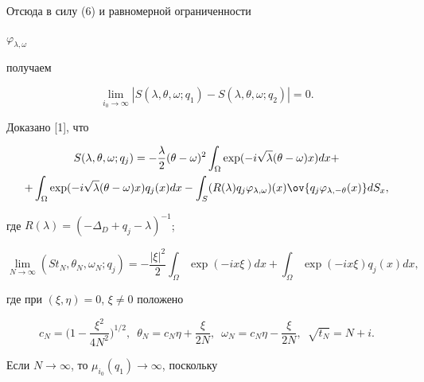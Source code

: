 Отсюда в силу (6) и равномерной ограниченности 


$\varphi_{\lambda,\omega}$ 


получаем 


\begin{equation} 


\lim_{i_0\to\infty} 


|S(\lambda,\theta,\omega;q_1)- 


S(\lambda,\theta,\omega;q_2)|=0. 


\end{equation} 


Доказано [1], что 


\begin{multline*} 


S(\lambda,\theta,\omega;q_j)=-\frac{\lambda}{2} 


(\theta-\omega)^2\int_\Omega\exp(-i\sqrt{\lambda} 


(\theta-\omega)x)dx+\\ 


% 


+\int_\Omega\exp(-i\sqrt{\lambda}(\theta-\omega)x)q_j(x)dx- 


\int_S(R(\lambda)q_j\varphi_{\lambda,\omega})(x) 


\ov{q_j\varphi_{\lambda,-\theta}(x)}d S_x, 


\end{multline*} 


где $R(\lambda)=(-\Delta_D+q_j-\lambda)^{-1}$; 


$$ 


\lim_{N\to\infty} 


(St_N,\theta_N,\omega_N;q_j)=-\frac{|\xi|^2}{2} 


\int_\Omega\exp(-i x\xi)dx+\int_\Omega 


\exp(-i x\xi)q_j(x)dx, 


$$ 


где при $(\xi,\eta)=0$, $\xi\ne0$ положено 


$$ 


c_N=\bigg(1-\frac{\xi^2}{4N^2}\bigg)^{1/2},\ \; 


\theta_N=c_N\eta+\frac{\xi}{2N},\ \; 


\omega_N=c_N\eta-\frac{\xi}{2N},\ \; 


\sqrt{t_N}=N+i. 


$$ 


 


Если $N\to\infty$, то $\mu_{i_0}(q_1)\to\infty$, поскольку 


